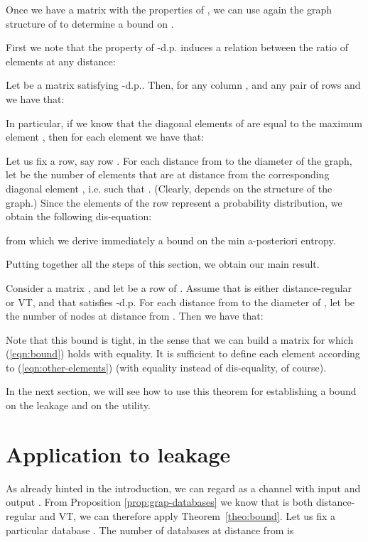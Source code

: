 \documentclass{llncs}
\begin{document}
Once we have a matrix with the properties of , we can use again the graph structure of  to determine a bound on . 

First we note that the property of -d.p. induces a relation between the ratio of elements at any distance: 

\begin{remark}
Let  be a matrix satisfying  -d.p.. Then, for any column , and any pair of rows  and  we have that:

\end{remark}
In particular, if we know that the diagonal elements of  are equal to the maximum element , then 
for each element  we have that:

Let us fix a row, say row . For each distance  from  to the diameter of the graph, let  be the number of elements  that are at distance  from the corresponding diagonal element , i.e. such that . (Clearly,  depends on the structure of the graph.) Since the elements of the row  represent a probability distribution, we obtain the following dis-equation: 


from which we derive immediately a bound on the min a-posteriori entropy. 

Putting together all the steps  of this section, we  obtain our main result. 

\begin{theorem}\label{theo:bound}
Consider a matrix , and let  be a row of . Assume that  is either  distance-regular or VT, and that  satisfies -d.p.
For each distance   from  to the diameter of ,  let  be the number of nodes  at distance  from . 
Then we have that:

\end{theorem}

Note that this bound is tight, in the sense that we can build a matrix for which (\ref{eqn:bound}) holds with equality. 
It is sufficient to define each element  according to (\ref{eqn:other-elements}) (with equality instead of dis-equality, of course). 

In the next section, we will see how to use this theorem for establishing a bound on the leakage and on the utility. 

\section{Application  to leakage}\label{section:leakage}
As already hinted in the introduction, we can regard  as a channel with input  and output . 
From Proposition \ref{prop:grap-databases} we know that   is both distance-regular and VT, we can therefore apply Theorem~\ref{theo:bound}. 
Let us fix a particular  database . The number of databases at distance  from  is 
\end{document}
